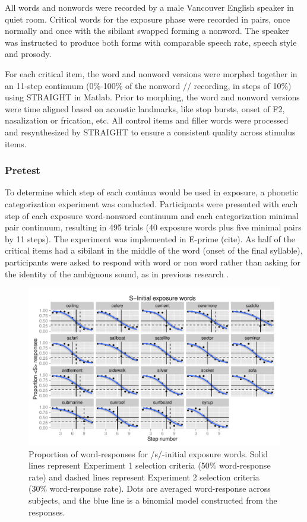 All words and nonwords were recorded by a male Vancouver English speaker in quiet room.  
Critical words for the exposure phase were recorded in pairs, once normally and once with the sibilant swapped forming a nonword.  
The speaker was instructed to produce both forms with comparable speech rate, speech style and prosody.

For each critical item, the word and nonword versions were morphed together in an 11-step continuum (0\%-100\% of the nonword /\textesh/ recording, in steps of 10\%) using STRAIGHT \citep{Kawahara2008} in Matlab.  
Prior to morphing, the word and nonword versions were time aligned based on acoustic landmarks, like stop bursts, onset of F2, nasalization or frication, etc.  
All control items and filler words were processed and resynthesized by STRAIGHT to ensure a consistent quality across stimulus items.

\subsubsection{Pretest}

To determine which step of each continua would be used in exposure, a phonetic categorization experiment was conducted.  
Participants were presented with each step of each exposure word-nonword continuum and each categorization minimal pair continuum, resulting in 495 trials (40 exposure words plus five minimal pairs by 11 steps).  
The experiment was implemented in E-prime (cite).  
As half of the critical items had a sibilant in the middle of the word (onset of the final syllable), participants were asked to respond with word or non word rather than asking for the identity of the ambiguous sound, as in previous research \citep{Reinisch2013}.  

\begin{figure}
\includegraphics[width=\textwidth]{sinitialpretest.pdf}
\caption{Proportion of word-responses for /s/-initial exposure words. Solid lines represent Experiment 1 selection criteria (50\% word-response rate) and dashed lines represent Experiment 2 selection criteria (30\% word-response rate).  Dots are averaged word-response across subjects, and the blue line is a binomial model constructed from the responses.}
\end{figure}

